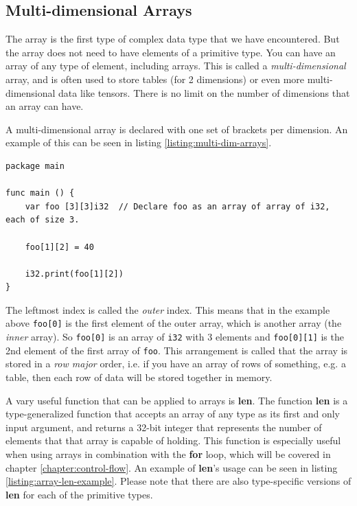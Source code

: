 \documentclass[11pt,fleqn,openany]{book} %
\begin{document}
\subsection{Multi-dimensional Arrays}
\label{subsection:multi-dimensional-arrays}

The array is the first type of complex data type that we have encountered. But the array does not need to have elements of a primitive type.  You can have an array of any type of element, including arrays. This is called a \textit{multi-dimensional} array, and is often used to store tables (for 2 dimensions) or even more multi-dimensional data like tensors. There is no limit on the number of dimensions that an array can have.

A multi-dimensional array is declared with one set of brackets per dimension. An example of this can be seen in listing \ref{listing:multi-dim-arrays}.

\begin{lstlisting}[caption={Multi-dimensional arrays},captionpos=b,label={listing:multi-dim-arrays}]
package main

func main () {
	var foo [3][3]i32  // Declare foo as an array of array of i32, each of size 3.
    
    foo[1][2] = 40
    
    i32.print(foo[1][2])
}
\end{lstlisting}

The leftmost index is called the \textit{outer} index. This means that in the example above \texttt{foo[0]} is the first element of the outer array, which is another array (the \textit{inner} array). So \texttt{foo[0]} is an array of \texttt{i32} with 3 elements and \texttt{foo[0][1]} is the 2nd element of the first array of \texttt{foo}. This arrangement is called that the array is stored in a \textit{row major} order, i.e. if you have an array of rows of something, e.g. a table, then each row of data will be stored together in memory.

A vary useful function that can be applied to arrays is \textbf{len}. The function \textbf{len} is a type-generalized function that accepts an array of any type as its first and only input argument, and returns a 32-bit integer that represents the number of elements that that array is capable of holding. This function is especially useful when using arrays in combination with the \textbf{for} loop, which will be covered in chapter \ref{chapter:control-flow}. An example of \textbf{len}'s usage can be seen in listing \ref{listing:array-len-example}. Please note that there are also type-specific versions of \textbf{len} for each of the primitive types.
\end{document}
